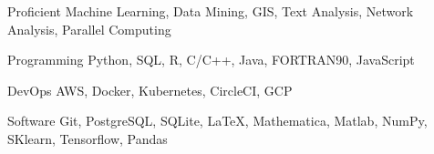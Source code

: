 

\begin{cvskills}

  \cvskill
    {Proficient} %
    {Machine Learning, Data Mining, GIS, Text Analysis, Network Analysis, Parallel Computing} %

  \cvskill
    {Programming} %
    {Python, SQL, R, C/C++, Java, FORTRAN90, JavaScript} %


    \cvskill
     {DevOps} %
     {AWS, Docker, Kubernetes, CircleCI, GCP} %


  \cvskill
    {Software} %
    {Git, PostgreSQL, SQLite, \LaTeX, Mathematica, Matlab, NumPy, SKlearn, Tensorflow, Pandas} %



\end{cvskills}
